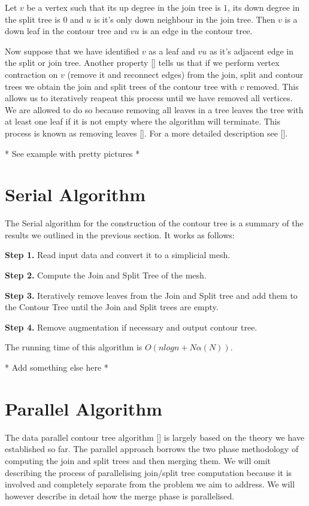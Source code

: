 \begin{defn} Let $v$ be a vertex such that its up degree in the join tree is $1$, its down degree in the split tree is $0$ and $u$ is it's only down neighbour in the join tree. Then $v$ is a down leaf in the contour tree and $vu$ is an edge in the contour tree.  \end{defn}


Now suppose that we have identified $v$ as a leaf and $vu$ as it's adjacent edge in the split or join tree. Another property [] tells us that if we perform vertex contraction on $v$ (remove it and reconnect edges) from the join, split and contour trees we obtain the join and split trees of the contour tree with $v$ removed. This allows us to iteratively reapeat this process until we have removed all vertices. We are allowed to do so because removing all leaves in a tree leaves the tree with at least one leaf if it is not empty where the algorithm will terminate. This process is known as removing leaves []. For a more detailed description see [].
    
* See example with pretty pictures *

\section{Serial Algorithm}

The Serial algorithm for the construction of the contour tree is a summary of the results we outlined in the previous section. It works as follows:

\textbf{Step 1.} Read input data and convert it to a simplicial mesh.

\textbf{Step 2.} Compute the Join and Split Tree of the mesh.

\textbf{Step 3.} Iteratively remove leaves from the Join and Split tree and add them to the Contour Tree until the Join and Split trees are empty.

\textbf{Step 4.} Remove augmentation if necessary and output contour tree.

The running time of this algorithm is $O(nlogn + N\alpha(N))$. 

* Add something else here *


\section{Parallel Algorithm}

The data parallel contour tree algorithm [] is largely based on the theory we have established so far. The parallel approach borrows the two phase methodology of computing the join and split trees and then merging them. We will omit describing the process of parallelising join/split tree computation because it is involved and completely separate from the problem we aim to address. We will however describe in detail how the merge phase is parallelised.


